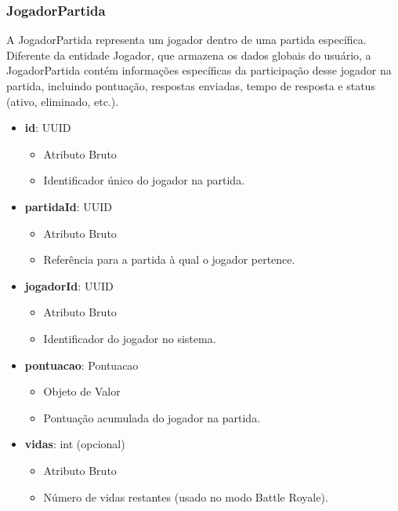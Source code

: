     \subsubsection{JogadorPartida}
    A JogadorPartida representa um jogador dentro de uma partida específica. Diferente da entidade Jogador, que armazena os dados globais do usuário, a JogadorPartida contém informações específicas da participação desse jogador na partida, incluindo pontuação, respostas enviadas, tempo de resposta e status (ativo, eliminado, etc.).
    \begin{itemize}
        \item \textbf{id}: UUID  
              \begin{itemize}
                  \item Atributo Bruto
                  \item Identificador único do jogador na partida.
              \end{itemize}
    
        \item \textbf{partidaId}: UUID  
              \begin{itemize}
                  \item Atributo Bruto
                  \item Referência para a partida à qual o jogador pertence.
              \end{itemize}
    
        \item \textbf{jogadorId}: UUID  
              \begin{itemize}
                  \item Atributo Bruto
                  \item Identificador do jogador no sistema.
              \end{itemize}
    
        \item \textbf{pontuacao}: Pontuacao  
              \begin{itemize}
                  \item Objeto de Valor
                  \item Pontuação acumulada do jogador na partida.
              \end{itemize}
    
        \item \textbf{vidas}: int (opcional)  
              \begin{itemize}
                  \item Atributo Bruto
                  \item Número de vidas restantes (usado no modo Battle Royale).
              \end{itemize}
    

\end{itemize}
